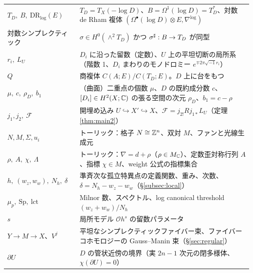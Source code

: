 \begin{longtable}{>{\raggedright\arraybackslash}p{3.5cm}>{\raggedright\arraybackslash}p{11.3cm}}
\footnotesize $T_D,\ B,\ \mathrm{DR}_{\log}(E)$ & $T_D=T_X(-\log D)$、$B=\Omega^1(\log D)=T_D^*$、対数 de Rham 複体 $(\Omega^\bullet(\log D)\otimes E,\nabla^{\log})$\\
\footnotesize 対数シンプレクティック & $\sigma\in H^0(\wedge^2T_D)$ かつ $\sigma^\sharp:B\to T_D$ が同型\\
\footnotesize $r_i,\ L_U$ & $D_i$ に沿った留数（定数）、$U$ 上の平坦切断の局所系（階数 1、$D_i$ まわりのモノドロミー $e^{\mp2\pi\sqrt{-1}r_i}$）\\
\footnotesize $Q$ & 商複体 $C(A;E)/C(T_D;E)$。$D$ 上に台をもつ\\
\footnotesize $\mu,\ c,\ \rho_D,\ b_1$ & （曲面）二重点の個数 $\mu$、$D$ の既約成分数 $c$、$[D_i]\in H^2(X;\mathbb C)$ の張る空間の次元 $\rho_D$、$b_1=c-\rho$\\
\footnotesize $j_1,j_2,\ \mathcal F$ & 開埋め込み $U\hookrightarrow X'\hookrightarrow X$、$\mathcal F=j_{2!}Rj_{1*}L_U$（定理 \ref{thm:main2}）\\
\footnotesize $N,M,\Sigma,u_i$ & トーリック：格子 $N\cong\mathbb Z^n$、双対 $M$、ファンと光線生成元\\
\footnotesize $\rho,\ A,\ \chi,\ \Lambda$ & トーリック：$\nabla=d+\rho$（$\rho\in M_\mathbb C$）、定数歪対称行列 $A$、指標 $\chi\in M$、weight 公式の指標集合\\
\footnotesize $h,\ (w_z,w_w),\ N_h,\ \delta$ & 準斉次な孤立特異点の定義関数、重み、次数、$\delta=N_h-w_z-w_w$（\S\ref{subsec:local}）\\
\footnotesize $\mu_p,\ \mathrm{Sp},\ \mathrm{lct}$ & Milnor 数、スペクトル、log canonical threshold $(w_z+w_w)/N_h$\\
\footnotesize $s$ & 局所モデル $\mathcal O h^s$ の留数パラメータ\\
\footnotesize $Y\to M\to X$、$V^j$ & 平坦なシンプレクティックファイバー束、ファイバーコホモロジーの Gauss--Manin 束（\S\ref{sec:regular}）\\
\footnotesize $\partial U$ & $D$ の管状近傍の境界（実 $2n-1$ 次元の閉多様体、$\chi(\partial U)=0$）\\
\end{longtable}
